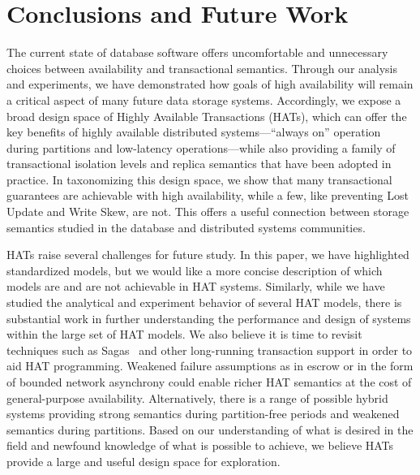 
\section{Conclusions and Future Work}
\label{sec:conclusion}

The current state of database software offers uncomfortable and
unnecessary choices between availability and transactional semantics.
Through our analysis and experiments, we have demonstrated how goals
of high availability will remain a critical aspect of many future data
storage systems. Accordingly, we expose a broad design space of Highly
Available Transactions (HATs), which can offer the key benefits of
highly available distributed systems---``always on'' operation during
partitions and low-latency operations---while also providing a family
of transactional isolation levels and replica semantics that have been
adopted in practice.  In taxonomizing this design space, we show that
many transactional guarantees are achievable with high availability,
while a few, like preventing Lost Update and Write Skew, are not. This
offers a useful connection between storage semantics studied in the
database and distributed systems communities.

HATs raise several challenges for future study. In this paper, we have
highlighted standardized models, but we would like a more concise
description of which models are and are not achievable in HAT
systems. Similarly, while we have studied the analytical and
experiment behavior of several HAT models, there is substantial work
in further understanding the performance and design of systems within
the large set of HAT models. We also believe it is time to revisit
techniques such as Sagas~\cite{sagas} and other long-running
transaction support in order to aid HAT programming. Weakened failure
assumptions as in escrow or in the form of bounded network asynchrony
could enable richer HAT semantics at the cost of general-purpose
availability. Alternatively, there is a range of possible hybrid
systems providing strong semantics during partition-free periods and
weakened semantics during partitions. Based on our understanding of
what is desired in the field and newfound knowledge of what is
possible to achieve, we believe HATs provide a large and useful design
space for exploration.


